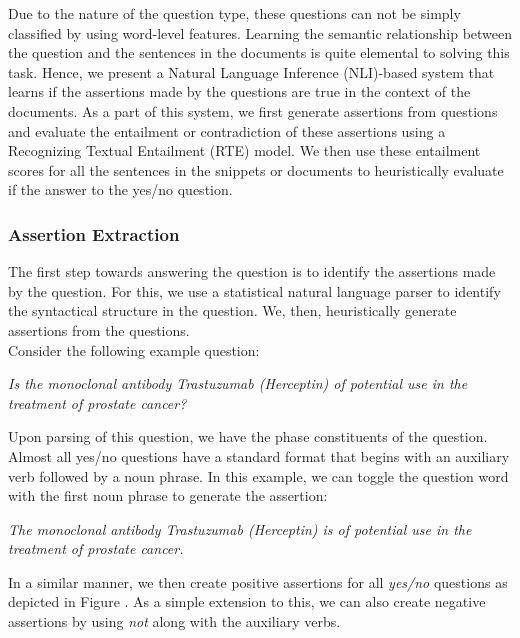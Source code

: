 Due to the nature of the question type, these questions can not be simply classified by using word-level features. Learning the semantic relationship between the question and the sentences in the documents is quite elemental to solving this task. Hence, we present a Natural Language Inference (NLI)-based system that learns if the assertions made by the questions are true in the context of the documents. As a part of this system, we first generate assertions from questions and evaluate the entailment or contradiction of these assertions using a Recognizing Textual Entailment (RTE) model. We then use these entailment scores for all the sentences in the snippets or documents to heuristically evaluate if the answer to the yes/no question.


\subsubsection{Assertion Extraction}

The first step towards answering the question is to identify the assertions made by the question. For this, we use a statistical natural language parser to identify the syntactical structure in the question. We, then, heuristically generate assertions from the questions.\\
Consider the following example question:

\textit{Is the monoclonal antibody Trastuzumab (Herceptin) of potential use in the treatment of prostate cancer?}

Upon parsing of this question, we have the phase constituents of the question. Almost all yes/no questions have a standard format that begins with an auxiliary verb followed by a noun phrase. In this example, we can toggle the question word with the first noun phrase to generate the assertion:

\textit{The monoclonal antibody Trastuzumab (Herceptin) is of potential use in the treatment of prostate cancer.}

In a similar manner, we then create positive assertions for all \textit{yes/no} questions as depicted in Figure . As a simple extension to this, we can also create negative assertions by using \textit{not} along with the auxiliary verbs.

